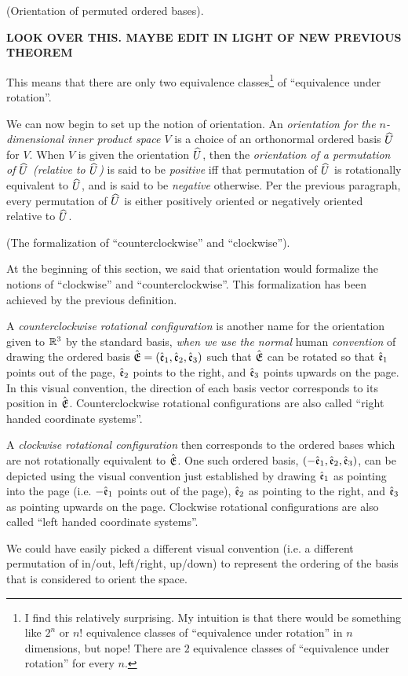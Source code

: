 \begin{defn}
    (Orientation of permuted ordered bases).

    \textbf{LOOK OVER THIS. MAYBE EDIT IN LIGHT OF NEW PREVIOUS THEOREM}
    
    This means that there are only two equivalence classes\footnote{I find this relatively surprising. My intuition is that there would be something like $2^n$ or $n!$ equivalence classes of ``equivalence under rotation'' in $n$ dimensions, but nope! There are $2$ equivalence classes of ``equivalence under rotation'' for every $n$.} of ``equivalence under rotation''.
    
    We can now begin to set up the notion of orientation. An \textit{orientation for the $n$-dimensional inner product space $V$} is a choice of an orthonormal ordered basis $\widehat{U}$ for $V$. When $V$ is given the orientation $\widehat{U}$, then the \textit{orientation of a permutation of $\widehat{U}$ (relative to $\widehat{U}$)} is said to be \textit{positive} iff that permutation of $\widehat{U}$ is rotationally equivalent to $\widehat{U}$, and is said to be \textit{negative} otherwise. Per the previous paragraph, every permutation of $\widehat{U}$ is either positively oriented or negatively oriented relative to $\widehat{U}$.
\end{defn}

\begin{remark}
\label{ch::exterior_pwrs::rmk::formalization_ccw_cw}
    (The formalization of ``counterclockwise'' and ``clockwise'').
    
    At the beginning of this section, we said that orientation would formalize the notions of ``clockwise'' and ``counterclockwise''. This formalization has been achieved by the previous definition.
    
    A \textit{counterclockwise rotational configuration} is another name for the orientation given to $\mathbb{R}^3$ by the standard basis, \textit{when we use the normal} human \textit{convention} of drawing the ordered basis ${\hat{\mathfrak{E}}} = (\hat{\mathfrak{e}}_1, \hat{\mathfrak{e}}_2, \hat{\mathfrak{e}}_3)$ such that ${\hat{\mathfrak{E}}}$ can be rotated so that $\hat{\mathfrak{e}}_1$ points out of the page, $\hat{\mathfrak{e}}_2$ points to the right, and $\hat{\mathfrak{e}}_3$ points upwards on the page. In this visual convention, the direction of each basis vector corresponds to its position in ${\hat{\mathfrak{E}}}$. Counterclockwise rotational configurations are also called ``right handed coordinate systems''.
    
    A \textit{clockwise rotational configuration} then corresponds to the ordered bases which are not rotationally equivalent to ${\hat{\mathfrak{E}}}$. One such ordered basis, $(-\hat{\mathfrak{e}}_1, \hat{\mathfrak{e}}_2, \hat{\mathfrak{e}}_3)$, can be depicted using the visual convention just established by drawing $\hat{\mathfrak{e}}_1$ as pointing into the page (i.e. $-\hat{\mathfrak{e}}_1$ points out of the page), $\hat{\mathfrak{e}}_2$ as pointing to the right, and $\hat{\mathfrak{e}}_3$ as pointing upwards on the page. Clockwise rotational configurations are also called ``left handed coordinate systems''.
    
    We could have easily picked a different visual convention (i.e. a different permutation of in/out, left/right, up/down) to represent the ordering of the basis that is considered to orient the space.
\end{remark}

